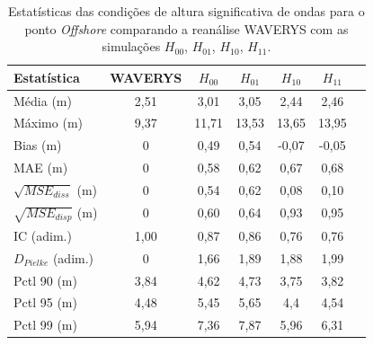 \begin{table}[ht]
\centering
\begin{tabular}{lcccccc}
\hline
\textbf{Estatística} & \textbf{WAVERYS} & \textbf{$H_{00}$} & \textbf{$H_{01}$} & \textbf{$H_{10}$} & \textbf{$H_{11}$} \\
\hline
Média (m) & 2,51 & 3,01 & 3,05 & 2,44 & 2,46 \\
Máximo (m) & 9,37 & 11,71 & 13,53 & 13,65 & 13,95 \\
Bias (m) & 0 & 0,49 & 0,54 & -0,07 & -0,05 \\
MAE (m) & 0 & 0,58 & 0,62 & 0,67 & 0,68 \\
$\sqrt{MSE_{diss}}$ (m) & 0 & 0,54 & 0,62 & 0,08 & 0,10 \\
$\sqrt{MSE_{disp}}$ (m) & 0 & 0,60 & 0,64 & 0,93 & 0,95 \\
IC (adim.) & 1,00 & 0,87 & 0,86 & 0,76 & 0,76 \\
$D_{Pielke}$ (adim.) & 0 & 1,66 & 1,89 & 1,88 & 1,99 \\
Pctl 90 (m) & 3,84 & 4,62 & 4,73 & 3,75 & 3,82 \\
Pctl 95 (m) & 4,48 & 5,45 & 5,65 & 4,4 & 4,54 \\
Pctl 99 (m) & 5,94 & 7,36 & 7,87 & 5,96 & 6,31 \\
\hline
\end{tabular}
\caption{Estatísticas das condições de altura significativa de ondas para o ponto \textit{Offshore} comparando a reanálise WAVERYS com as simulações $H_{00}$, $H_{01}$, $H_{10}$, $H_{11}$.}
\label{estats:offshore}
\end{table}
